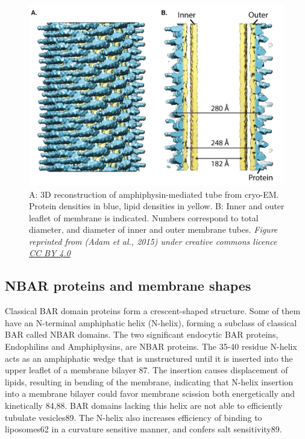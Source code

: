 		
\begin{figure}[H]
	\centering
\includegraphics[scale=0.4]{figures/intro/BAR_scaffold}
\caption[BAR domain scaffolds]
{A: 3D reconstruction of amphiphysin-mediated tube from cryo-EM. Protein densities in blue,  lipid densities in yellow. B: Inner and outer leaflet of membrane is indicated. Numbers correspond to total diameter, and diameter of inner and outer membrane tubes. \textit{Figure reprinted from (Adam et al., 2015) under creative commons licence \href{https://creativecommons.org/licenses/by/4.0/}{CC BY 4.0}}}
	\end{figure}



	\subsection{NBAR proteins and membrane shapes}	
	Classical BAR domain proteins form a crescent-shaped structure. Some of them have an N-terminal amphiphatic helix (N-helix), forming a subclass of classical BAR called NBAR domains. The two significant endocytic BAR proteins, Endophilins and Amphiphysins, are NBAR proteins. The 35-40 residue N-helix acts as an amphiphatic wedge that is unstructured until it is inserted into the upper leaflet of a membrane bilayer 87. The insertion causes displacement of lipids, resulting in bending of the membrane, indicating that N-helix insertion into a membrane bilayer could favor membrane scission both energetically and kinetically 84,88. BAR domains lacking this helix are not able to efficiently tubulate vesicles89. The N-helix also increases efficiency of binding to liposomes62 in a curvature sensitive manner, and confers salt sensitivity89. 



